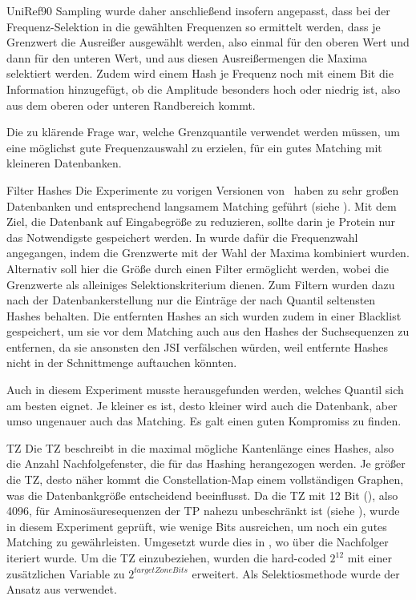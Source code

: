 \begin{experiment}{UniRef90 Sampling}
         wurde daher anschließend insofern angepasst, dass bei der Frequenz-Selektion in  die gewählten Frequenzen so ermittelt werden, dass je Grenzwert die Ausreißer ausgewählt werden, also einmal für den oberen Wert und dann für den unteren Wert, und aus diesen Ausreißermengen die Maxima selektiert werden. Zudem wird einem Hash je Frequenz noch mit einem Bit die Information hinzugefügt, ob die Amplitude besonders hoch oder niedrig ist, also aus dem oberen oder unteren Randbereich kommt.

        Die zu klärende Frage war, welche Grenzquantile verwendet werden müssen, um eine möglichst gute Frequenzauswahl zu erzielen, für ein gutes Matching mit kleineren Datenbanken.
    \end{experiment}
    \begin{experiment}{Filter Hashes} %
        \label{exp:filter_hashes}
        Die Experimente zu vorigen Versionen von \protfin\ haben zu sehr großen Datenbanken und entsprechend langsamem Matching geführt (siehe ). Mit dem Ziel, die Datenbank auf Eingabegröße zu reduzieren, sollte darin je Protein nur das Notwendigste gespeichert werden. In  wurde dafür die Frequenzwahl angegangen, indem die Grenzwerte mit der Wahl der Maxima kombiniert wurden. Alternativ soll hier die Größe durch einen Filter ermöglicht werden, wobei die Grenzwerte als alleiniges Selektionskriterium dienen. Zum Filtern wurden dazu nach der Datenbankerstellung nur die Einträge der nach Quantil seltensten Hashes behalten. Die entfernten Hashes an sich wurden zudem in einer Blacklist gespeichert, um sie vor dem Matching auch aus den Hashes der Suchsequenzen zu entfernen, da sie ansonsten den \ac{JSI} verfälschen würden, weil entfernte Hashes nicht in der Schnittmenge auftauchen könnten.

        Auch in diesem Experiment musste herausgefunden werden, welches Quantil sich am besten eignet. Je kleiner es ist, desto kleiner wird auch die Datenbank, aber umso ungenauer auch das Matching. Es galt einen guten Kompromiss zu finden.
    \end{experiment}
    \begin{experiment}{\acl{TZ}} %
        \label{exp:target_zone}
        Die \ac{TZ} beschreibt in  die maximal mögliche Kantenlänge eines Hashes, also die Anzahl Nachfolgefenster, die für das Hashing herangezogen werden. Je größer die \ac{TZ}, desto näher kommt die Constellation-Map einem vollständigen Graphen, was die Datenbankgröße entscheidend beeinflusst. Da die \ac{TZ} mit 12 Bit (), also 4096, für Aminosäuresequenzen der \ac{TP} nahezu unbeschränkt ist (siehe ), wurde in diesem Experiment geprüft, wie wenige Bits ausreichen, um noch ein gutes Matching zu gewährleisten. Umgesetzt wurde dies in , wo über die Nachfolger iteriert wurde. Um die \ac{TZ} einzubeziehen, wurden die hard-coded $2^{12}$ mit einer zusätzlichen Variable zu $2^{targetZoneBits}$ erweitert. Als Selektiosmethode wurde der Ansatz aus  verwendet.
    \end{experiment}
